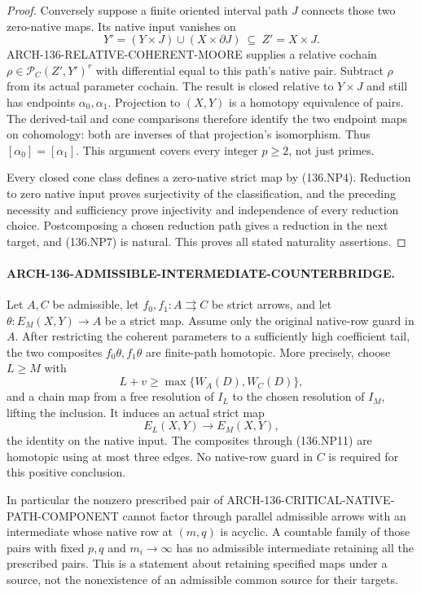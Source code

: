 \begin{proof}
Conversely suppose a finite oriented interval path \(J\)
connects those two zero-native maps.  Its native input vanishes
on
\[
        Y'=(Y\times J)\cup(X\times\partial J)
                               \ \subseteq\ Z'=X\times J.
\]
ARCH-136-RELATIVE-COHERENT-MOORE supplies a relative cochain
\(\rho\in\mathcal P_C(Z',Y')^r\) with differential equal
to this path's native pair.  Subtract \(\rho\) from its
actual parameter cochain.  The result is closed relative to
\(Y\times J\) and still has endpoints \(\alpha_0,\alpha_1\).
Projection to \((X,Y)\) is a homotopy equivalence of pairs.
The derived-tail and cone comparisons therefore identify the
two endpoint maps on cohomology: both are inverses of that
projection's isomorphism.  Thus
\([\alpha_0]=[\alpha_1]\).  This argument covers every
integer \(p\geq2\), not just primes.

Every closed cone class defines a zero-native strict map by
(136.NP4).  Reduction to zero native input proves surjectivity
of the classification, and the preceding necessity and sufficiency
prove injectivity and independence of every reduction choice.
Postcomposing a chosen reduction path gives a reduction in the
next target, and (136.NP7) is natural.  This proves all stated
naturality assertions.
\end{proof}

\paragraph{ARCH-136-ADMISSIBLE-INTERMEDIATE-COUNTERBRIDGE.}
Let \(A,C\) be admissible, let \(f_0,f_1:A\rightrightarrows C\)
be strict arrows, and let \(\theta:E_M(X,Y)\to A\) be a
strict map.  Assume only the original native-row guard in \(A\).
After restricting the coherent parameters to a sufficiently high
coefficient tail, the two composites \(f_0\theta,f_1\theta\)
are finite-path homotopic.  More precisely, choose \(L\geq M\)
with
\[
                L+v\geq\max\{W_A(D),W_C(D)\},          \tag{136.NP10}
\]
and a chain map from a free resolution of \(I_L\) to the
chosen resolution of \(I_M\), lifting the inclusion.  It
induces an actual strict map
\[
                  E_L(X,Y)\longrightarrow E_M(X,Y),
                                                               \tag{136.NP11}
\]
the identity on the native input.  The composites through
(136.NP11) are homotopic using at most three edges.  No native-row
guard in \(C\) is required for this positive conclusion.

In particular the nonzero prescribed pair of
ARCH-136-CRITICAL-NATIVE-PATH-COMPONENT cannot factor through
parallel admissible arrows with an intermediate whose native
row at \((m,q)\) is acyclic.  A countable family of those
pairs with fixed \(p,q\) and \(m_i\to\infty\) has no
admissible intermediate retaining all the prescribed pairs.
This is a statement about retaining specified maps under a
source, not the nonexistence of an admissible common source
for their targets.

